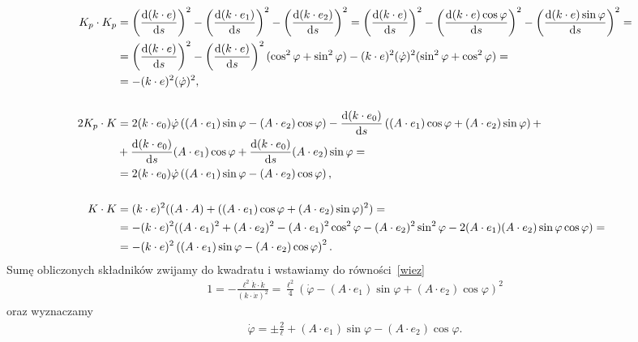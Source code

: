 \begin{align*}
K_p\cdot K_p &= \left(  \frac{\text{d} (k\cdot e)}{\text{d} s} \right)^2 
		- \left( \frac{\text{d} (k\cdot e_1)}{\text{d} s} \right)^2 
		- \left( \frac{\text{d} (k\cdot e_2)}{\text{d} s} \right)^2 
		= \left(  \frac{\text{d} (k\cdot e)}{\text{d} s} \right)^2 
		- \left( \frac{\text{d} (k\cdot e)\cos\varphi}{\text{d} s} \right)^2 
		- \left( \frac{\text{d} (k\cdot e)\sin\varphi}{\text{d} s} \right)^2 =
	\\ &= \left(  \frac{\text{d} (k\cdot e)}{\text{d} s} \right)^2 
		- \left( \frac{\text{d} (k\cdot e)}{\text{d} s} 
            \right)^2 (\cos^2\varphi + \sin^2\varphi)
		- (k\cdot e)^2  (\dot{\varphi} )^2 (\sin^2\varphi + \cos^2\varphi) =
	\\ &= - (k\cdot e)^2  (\dot{\varphi} )^2 ,
	\\
	\\
2K_p\cdot K &= 2(k\cdot e_0 ) \dot{\varphi} \left( (A\cdot e_1) 
                \sin\varphi -(A\cdot e_2) \cos\varphi \right) 
        -\frac{\text{d}(k\cdot e_0)}{\text{d} s} \left((A\cdot e_1)\cos\varphi + 
                (A\cdot e_2) \sin\varphi \right)+
    \\ &+\frac{\text{d}(k\cdot e_0)}{\text{d} s} (A\cdot e_1)\cos\varphi 
        +\frac{\text{d}(k\cdot e_0)}{\text{d} s} (A\cdot e_2)\sin\varphi =
    \\ &=2(k\cdot e_0 ) \dot{\varphi} \left( (A\cdot e_1) \sin\varphi -
                (A\cdot e_2) \cos\varphi \right) , 
	\\
	\\
K\cdot K &= (k\cdot e)^2 ( (A\cdot A ) +( \left(A\cdot e_1\right)\cos\varphi+
                    \left(A\cdot e_2\right)\sin\varphi )^2) =
    \\   &=- (k\cdot e)^2( (A\cdot e_1 )^2 + (A\cdot e_2)^2 -
                    (A\cdot e_1)^2\cos^2\varphi - (A\cdot e_2)^2\sin^2\varphi
            - 2 (A\cdot e_1) (A\cdot e_2) \sin\varphi\cos\varphi ) =
    \\   &=- (k\cdot e)^2\left( (A\cdot e_1) \sin\varphi -
                    (A\cdot e_2) \cos\varphi \right)^2 .
\end{align*}
\noindent
Sumę obliczonych składników zwijamy do kwadratu 
i wstawiamy do równości~\eqref{wiez}
\begin{align*}
1 = -\frac{\ell^2\dot{k}\cdot \dot{k}}{(k\cdot \dot{x})^2}  =
\frac{\ell^2}{4} 
( \dot{\varphi} -(A\cdot e_1) \sin\varphi +(A\cdot e_2) \cos\varphi )^2 
\end{align*}
oraz wyznaczamy
\begin{align*}
\dot{\varphi} = \pm \frac{2}{\ell} +
(A\cdot e_1) \sin\varphi - (A\cdot e_2) \cos\varphi .
\end{align*}
